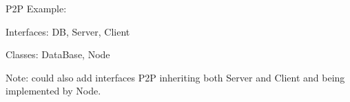 \documentclass[handout]
{beamer}
\begin{document}
\lstset{language=Creol,columns=flexible}



\begin{frame}
P2P Example: 

Interfaces: DB, Server, Client
 
Classes: DataBase, Node

Note:
could also add interfaces P2P inheriting both Server and Client
and being implemented by Node.
\end{frame}
\end{document}
